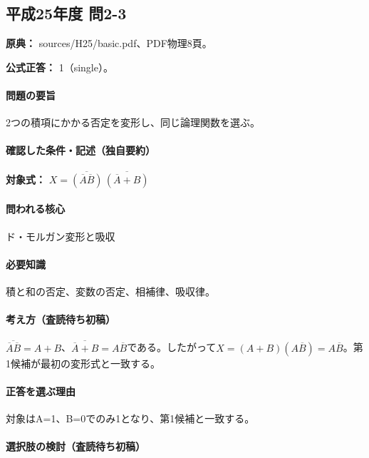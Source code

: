 \subsection{平成25年度 問2-3}
\label{q:h25-reg-basic-2-3}

\noindent\textbf{原典：} sources/H25/basic.pdf、PDF物理8頁。

\textbf{公式正答：} 1（single）。

\paragraph{問題の要旨} 2つの積項にかかる否定を変形し、同じ論理関数を選ぶ。

\paragraph{確認した条件・記述（独自要約）}\mbox{}\par

\noindent\textbf{対象式：} \(X=\overline{(\overline A\overline B)}\,\overline{(\overline A+B)}\)\par

\paragraph{問われる核心} ド・モルガン変形と吸収

\paragraph{必要知識} 積と和の否定、変数の否定、相補律、吸収律。

\paragraph{考え方（査読待ち初稿）} \(\overline{\overline A\overline B}=A+B\)、\(\overline{\overline A+B}=A\overline B\)である。したがって\(X=(A+B)(A\overline B)=A\overline B\)。第1候補が最初の変形式と一致する。

\paragraph{正答を選ぶ理由} 対象はA=\allowbreak{}1、B=\allowbreak{}0でのみ1となり、第1候補と一致する。

\paragraph{選択肢の検討（査読待ち初稿）}\mbox{}\par

